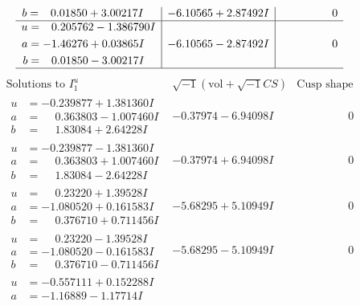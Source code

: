 \documentclass[1p]{elsarticle_modified}
\theoremstyle{definition}
\newcommand{\I}{\sqrt{-1}}
\begin{document}
$$\begin{array}{c|c|c}
\begin{aligned}
b &= \phantom{-}0.01850 + 3.00217 I\end{aligned}
 & -6.10565 + 2.87492 I & \phantom{-0.000000 } 0 \\ \hline\begin{aligned}
u &= \phantom{-}0.205762 - 1.386790 I \\
a &= -1.46276 + 0.03865 I \\
b &= \phantom{-}0.01850 - 3.00217 I\end{aligned}
 & -6.10565 - 2.87492 I & \phantom{-0.000000 } 0\\
 \hline 
 \end{array}$$\newpage$$\begin{array}{c|c|c}  
\text{Solutions to }I^u_{1}& \I (\text{vol} + \sqrt{-1}CS) & \text{Cusp shape}\\
 \hline 
\begin{aligned}
u &= -0.239877 + 1.381360 I \\
a &= \phantom{-}0.363803 - 1.007460 I \\
b &= \phantom{-}1.83084 + 2.64228 I\end{aligned}
 & -0.37974 - 6.94098 I & \phantom{-0.000000 } 0 \\ \hline\begin{aligned}
u &= -0.239877 - 1.381360 I \\
a &= \phantom{-}0.363803 + 1.007460 I \\
b &= \phantom{-}1.83084 - 2.64228 I\end{aligned}
 & -0.37974 + 6.94098 I & \phantom{-0.000000 } 0 \\ \hline\begin{aligned}
u &= \phantom{-}0.23220 + 1.39528 I \\
a &= -1.080520 + 0.161583 I \\
b &= \phantom{-}0.376710 + 0.711456 I\end{aligned}
 & -5.68295 + 5.10949 I & \phantom{-0.000000 } 0 \\ \hline\begin{aligned}
u &= \phantom{-}0.23220 - 1.39528 I \\
a &= -1.080520 - 0.161583 I \\
b &= \phantom{-}0.376710 - 0.711456 I\end{aligned}
 & -5.68295 - 5.10949 I & \phantom{-0.000000 } 0 \\ \hline\begin{aligned}
u &= -0.557111 + 0.152288 I \\
a &= -1.16889 - 1.17714 I \\

\end{aligned}
\end{array}$$
\end{document}
